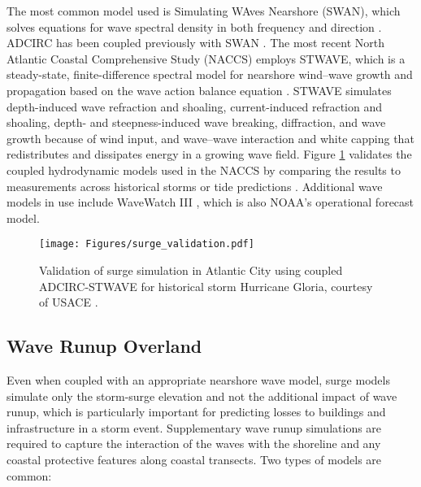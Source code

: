 The most common model used is Simulating WAves Nearshore (SWAN), which solves equations for wave spectral density in both frequency and direction \citep{zijlema2010computation}. ADCIRC has been coupled previously with SWAN \citep{dietrich2011modeling,kennedy2012tropical}. The most recent North Atlantic Coastal Comprehensive Study (NACCS) \citep{usace2015north} employs STWAVE, which is a steady-state, finite-difference spectral model for nearshore wind--wave growth and propagation based on the wave action balance equation \citep{smith2001stwave}. STWAVE simulates depth-induced wave refraction and shoaling, current-induced refraction and shoaling, depth- and steepness-induced wave breaking, diffraction, and wave growth because of wind input, and wave--wave interaction and white capping that redistributes and dissipates energy in a growing wave field. Figure \ref{fig:surge_validation} validates the coupled hydrodynamic models used in the NACCS by comparing the results to measurements across historical storms or tide predictions \citep{nadal-caraballo2015north}. Additional wave models in use include WaveWatch III \citep{smith2018validation}, which is also NOAA's operational forecast model. 

\begin{figure}[htb]
    \centering
    \texttt{[image: Figures/surge\_validation.pdf]}
    \caption{Validation of surge simulation in Atlantic City using coupled ADCIRC-STWAVE for historical storm Hurricane Gloria, courtesy of USACE \citep{nadal-caraballo2015north}.}
    \label{fig:surge_validation}
\end{figure}

\subsection{Wave Runup Overland}

Even when coupled with an appropriate nearshore wave model, surge models simulate only the storm-surge elevation and not the additional impact of wave runup, which is particularly important for predicting losses to buildings and infrastructure in a storm event. Supplementary wave runup simulations are required to capture the interaction of the waves with the shoreline and any coastal protective features along coastal transects. Two types of models are common:

